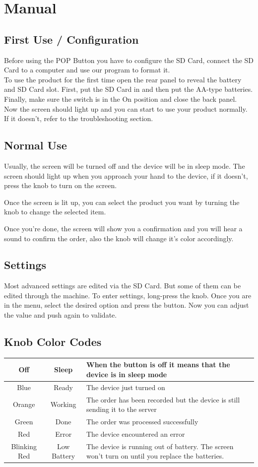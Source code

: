 \documentclass[12pt,a4paper,landscape]{article}
\begin{document}
\section*{Manual}
	\begin{multicols}{2}
		\subsection*{First Use / Configuration}
		Before using the POP Button you have to configure the SD Card, connect the SD Card to a computer and use our program to format it.\\
		To use the product for the first time open the rear panel to reveal the battery and SD Card slot. First, put the SD Card in and then put the AA-type batteries. Finally, make sure the switch is in the On position and close the back panel.\\
		Now the screen should light up and you can start to use your product normally. If it doesn't, refer to the troubleshooting section.
		\subsection*{Normal Use}
		Usually, the screen will be turned off and the device will be in sleep mode. The screen should light up when you approach your hand to the device, if it doesn't, press the knob to turn on the screen.

		Once the screen is lit up, you can select the product you want by turning the knob to change the selected item.

		Once you're done, the screen will show you a confirmation and you will hear a sound to confirm the order, also the knob will change it's color accordingly.
		\subsection*{Settings}
		Most advanced settings are edited via the SD Card. But some of them can be edited through the machine.
		To enter settings, long-press the knob. Once you are in the menu, select the desired option and press the button. Now you can adjust the value and push again to validate.
		\subsection*{Knob Color Codes}
			\begin{tabular}{|c|c|p{4.3cm}|}
			\hline
				Off & Sleep & When the button is off it means that the device is in sleep mode\\
				\hline
				Blue & Ready & The device just turned on\\
				\hline
				Orange & Working & The order has been recorded but the device is still sending it to the server\\
				\hline
				Green & Done & The order was processed successfully\\
				\hline
				Red & Error & The device encountered an error\\
				\hline
				Blinking Red & Low Battery & The device is running out of battery. The screen won't turn on until you replace the batteries.\\
				\hline
			\end{tabular}

\end{multicols}
\end{document}
